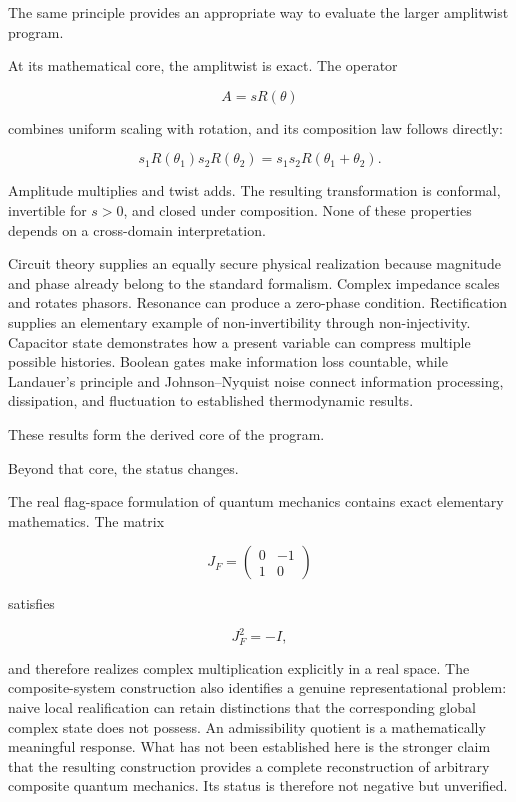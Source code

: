 \documentclass[11pt]{article}
\begin{document}
The same principle provides an appropriate way to evaluate the larger amplitwist program.

At its mathematical core, the amplitwist is exact. The operator

\begin{equation}
A=sR(\theta)
\end{equation}

combines uniform scaling with rotation, and its composition law follows directly:

\begin{equation}
s_1R(\theta_1)s_2R(\theta_2)
=
s_1s_2R(\theta_1+\theta_2).
\end{equation}

Amplitude multiplies and twist adds. The resulting transformation is conformal, invertible for $s>0$, and closed under composition. None of these properties depends on a cross-domain interpretation.

Circuit theory supplies an equally secure physical realization because magnitude and phase already belong to the standard formalism. Complex impedance scales and rotates phasors. Resonance can produce a zero-phase condition. Rectification supplies an elementary example of non-invertibility through non-injectivity. Capacitor state demonstrates how a present variable can compress multiple possible histories. Boolean gates make information loss countable, while Landauer's principle and Johnson--Nyquist noise connect information processing, dissipation, and fluctuation to established thermodynamic results.

These results form the derived core of the program.

Beyond that core, the status changes.

The real flag-space formulation of quantum mechanics contains exact elementary mathematics. The matrix

\begin{equation}
J_F
=
\begin{pmatrix}
0&-1\\
1&0
\end{pmatrix}
\end{equation}

satisfies

\begin{equation}
J_F^2=-I,
\end{equation}

and therefore realizes complex multiplication explicitly in a real space. The composite-system construction also identifies a genuine representational problem: naive local realification can retain distinctions that the corresponding global complex state does not possess. An admissibility quotient is a mathematically meaningful response. What has not been established here is the stronger claim that the resulting construction provides a complete reconstruction of arbitrary composite quantum mechanics. Its status is therefore not negative but unverified.
\end{document}
